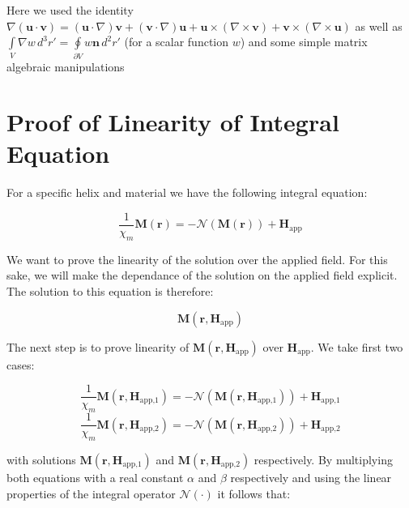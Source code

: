 Here we used the identity $\nabla(\textbf{u}\cdot\textbf{v}) = (\textbf{u}\cdot \nabla)\textbf{v} +  (\textbf{v}\cdot \nabla)\textbf{u} + \textbf{u}\times(\nabla\times\textbf{v}) + \textbf{v}\times(\nabla\times\textbf{u})$ as well as $\int\limits_V \nabla w \,d^3r'=  \oint\limits_{\partial V} w \textbf{n}\,d^2r'$ (for a scalar function $w$) and some simple matrix algebraic manipulations

\section{Proof of Linearity of Integral Equation}
\label{s:LinearityIntegralEquation}

For a specific helix and material we have the following integral equation:

\begin{equation}
\frac{1}{\chi_m}\textbf{M}(\textbf{r})  = -\mathcal{N}(\textbf{M}(\textbf{r})) + \textbf{H}_\text{app}
\end{equation}

We want to prove the linearity of the solution over the applied field. For this sake, we will make the dependance of the solution on the applied field explicit. The solution to this equation is therefore:

\begin{equation}
\textbf{M}(\textbf{r},\textbf{H}_\text{app})
\end{equation}

The next step is to prove linearity of $\textbf{M}(\textbf{r},\textbf{H}_\text{app})$ over $\textbf{H}_\text{app}$. We take first two cases: 


\begin{equation}\label{eq:case1}
\frac{1}{\chi_m}\textbf{M}(\textbf{r},\textbf{H}_\text{app,1})  = -\mathcal{N}(\textbf{M}(\textbf{r},\textbf{H}_\text{app,1})) + \textbf{H}_\text{app,1}
\end{equation}
\begin{equation}\label{eq:case2}
\frac{1}{\chi_m}\textbf{M}(\textbf{r},\textbf{H}_\text{app,2})  = -\mathcal{N}(\textbf{M}(\textbf{r},\textbf{H}_\text{app,2})) + \textbf{H}_\text{app,2}
\end{equation}

with solutions $\textbf{M}(\textbf{r},\textbf{H}_\text{app,1})$ and $\textbf{M}(\textbf{r},\textbf{H}_\text{app,2})$ respectively. By multiplying both equations with a real constant $\alpha$ and $\beta$ respectively and using the linear properties of the integral operator $\mathcal{N(\cdot)}$ it follows that:

